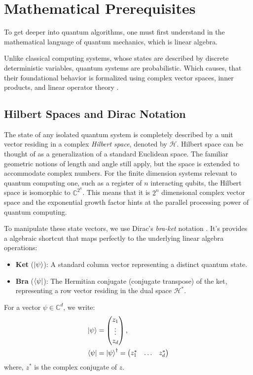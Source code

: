\section{Mathematical Prerequisites}

To get deeper into quantum algorithms, one must first understand in the mathematical language of quantum mechanics, which is linear algebra.
%
%

Unlike classical computing systems, whose states are described by discrete deterministic variables, quantum systems are probabilistic.
Which causes, that their foundational behavior is formalized using complex vector spaces, inner products, and linear operator theory \cite{nielsen2010quantum}.
%
%
\subsection{Hilbert Spaces and Dirac Notation}

The state of any isolated quantum system is completely described by a unit vector residing in a complex \textit{Hilbert space}, 
denoted by $\mathcal{H}$.
%
%
Hilbert space can be thought of as a generalization of a standard Euclidean space.
The familiar geometric notions of length and angle still apply, but the space is extended to accommodate complex numbers.
%
%
For the finite dimension systems relevant to quantum computing one, such as a register of $n$ interacting qubits, 
the Hilbert space is isomorphic to $\mathbb{C}^{2^n}$.
This means that it is $2^n$ dimensional complex vector space and the exponential growth factor 
hints at the parallel processing power of quantum computing.
%
%

To manipulate these state vectors, we use Dirac's \textit{bra-ket} notation \cite{dirac1939new}.
It's provides a algebraic shortcut that maps perfectly to the underlying linear algebra operations:
%
%
\begin{itemize}
    \item \textbf{Ket} ($\ket{\psi}$): A standard column vector representing a distinct quantum state.
    \item \textbf{Bra} ($\bra{\psi}$): The Hermitian conjugate (conjugate transpose) of the ket, representing a row vector residing in the dual space $\mathcal{H}^*$.
\end{itemize}
%
%

For a vector $\psi \in \mathbb{C}^d$, we write:
\bigskip
\begin{equation}
    \begin{split}
        \ket{\psi} &= \begin{pmatrix} z_1 \\ \vdots \\ z_d \end{pmatrix}, \\
        \bra{\psi} &= \ket{\psi}^\dagger = \begin{pmatrix} z_1^* & \dots & z_d^* \end{pmatrix}
    \end{split}
\end{equation}
\bigskip
where, $z^*$ is the complex conjugate of $z$.
%
%
